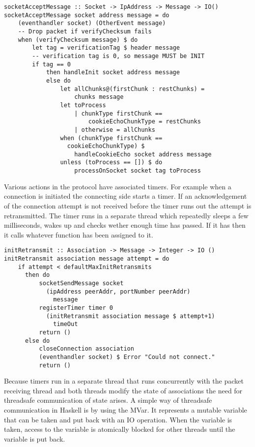 \begin{lstlisting}[caption={socketAcceptMessage decides what to do with a message}]
socketAcceptMessage :: Socket -> IpAddress -> Message -> IO()
socketAcceptMessage socket address message = do
    (eventhandler socket) (OtherEvent message)
    -- Drop packet if verifyChecksum fails
    when (verifyChecksum message) $ do
        let tag = verificationTag $ header message
        -- verification tag is 0, so message MUST be INIT
        if tag == 0 
            then handleInit socket address message
            else do
                let allChunks@(firstChunk : restChunks) =
                    chunks message
                let toProcess
                    | chunkType firstChunk ==
                        cookieEchoChunkType = restChunks
                    | otherwise = allChunks
                when (chunkType firstChunk == 
                  cookieEchoChunkType) $
                    handleCookieEcho socket address message
                unless (toProcess == []) $ do
                    processOnSocket socket tag toProcess
\end{lstlisting}

Various actions in the protocol have associated timers. For example when a connection is initiated the connecting side starts a timer. If an acknowledgement of the connection attempt is not received before the timer runs out the attempt is retransmitted.
The timer runs in a separate thread which repeatedly sleeps a few milliseconds, wakes up and checks wether enough time has passed. If it has then it calls whatever function has been assigned to it. 

\begin{lstlisting}[caption={The init retransmission function}]
initRetransmit :: Association -> Message -> Integer -> IO ()
initRetransmit association message attempt = do
    if attempt < defaultMaxInitRetransmits
      then do
          socketSendMessage socket 
            (ipAddress peerAddr, portNumber peerAddr)
              message
          registerTimer timer 0
            (initRetransmit association message $ attempt+1)
              timeOut
          return ()
      else do
          closeConnection association
          (eventhandler socket) $ Error "Could not connect."
          return ()
\end{lstlisting}

Because timers run in a separate thread that runs concurrently with the packet receiving thread and both threads modify the state of associations the need for threadsafe communication of state arises. A simple way of threadsafe communication in Haskell is by using the MVar. It represents a mutable variable that can be taken and put back with an IO operation. When the variable is taken, access to the variable is atomically blocked for other threads until the variable is put back. 

